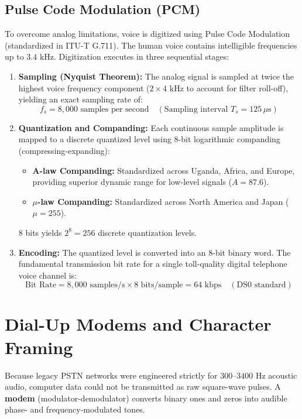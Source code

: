 \documentclass[12pt,a4paper]{report}
\begin{document}
\subsection{Pulse Code Modulation (PCM)}
To overcome analog limitations, voice is digitized using Pulse Code Modulation (standardized in ITU-T G.711). The human voice contains intelligible frequencies up to $3.4\text{ kHz}$. Digitization executes in three sequential stages:
\begin{enumerate}
    \item \textbf{Sampling (Nyquist Theorem):} The analog signal is sampled at twice the highest voice frequency component ($2 \times 4\text{ kHz}$ to account for filter roll-off), yielding an exact sampling rate of:
    \[ f_s = 8,000\text{ samples per second} \quad (\text{Sampling interval } T_s = 125\,\mu\text{s}) \]
    
    \item \textbf{Quantization and Companding:} Each continuous sample amplitude is mapped to a discrete quantized level using 8-bit logarithmic companding (compressing-expanding):
    \begin{itemize}
        \item \textbf{A-law Companding:} Standardized across Uganda, Africa, and Europe, providing superior dynamic range for low-level signals ($A = 87.6$).
        \item \textbf{$\mu$-law Companding:} Standardized across North America and Japan ($\mu = 255$).
    \end{itemize}
    8 bits yields $2^8 = 256$ discrete quantization levels.
    
    \item \textbf{Encoding:} The quantized level is converted into an 8-bit binary word. The fundamental transmission bit rate for a single toll-quality digital telephone voice channel is:
    \[ \text{Bit Rate} = 8,000\text{ samples/s} \times 8\text{ bits/sample} = 64\text{ kbps} \quad (\text{DS0 standard}) \]
\end{enumerate}

\section{Dial-Up Modems and Character Framing}
Because legacy PSTN networks were engineered strictly for $300\text{--}3400\text{ Hz}$ acoustic audio, computer data could not be transmitted as raw square-wave pulses. A \textbf{modem} (modulator-demodulator) converts binary ones and zeros into audible phase- and frequency-modulated tones.
\end{document}
